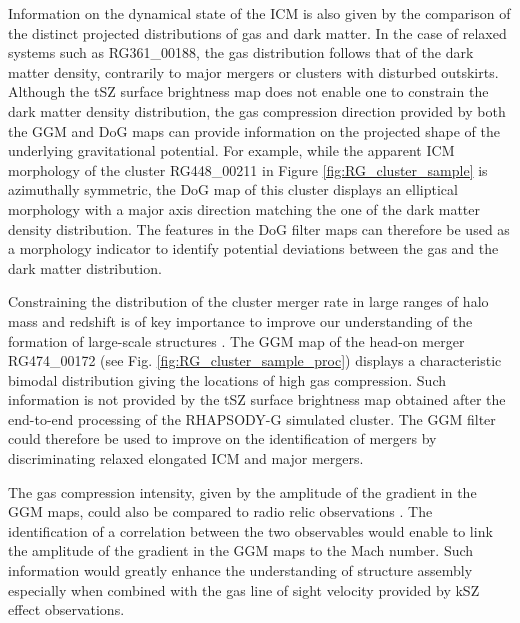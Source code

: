 \documentclass[traditabstract]{aa}
\begin{document}
Information on the dynamical state of the ICM is also given by the comparison of the distinct projected distributions of gas and dark matter. In the case of relaxed systems such as RG361\_00188, the gas distribution follows that of the dark matter density, contrarily to major mergers or clusters with disturbed outskirts. Although the tSZ surface brightness map does not enable one to constrain the dark matter density distribution, the gas compression direction provided by both the GGM and DoG maps can provide information on the projected shape of the underlying gravitational potential. For example, while the apparent ICM morphology of the cluster RG448\_00211 in Figure \ref{fig:RG_cluster_sample} is azimuthally symmetric, the DoG map of this cluster displays an elliptical morphology with a major axis direction matching the one of the dark matter density distribution. The features in the DoG filter maps can therefore be used as a morphology indicator to identify potential deviations between the gas and the dark matter distribution.

Constraining the distribution of the cluster merger rate in large ranges of halo mass and redshift is of key importance to improve our understanding of the formation of large-scale structures \citep[e.g.,][]{Fakhouri2010}. The GGM map of the head-on merger RG474\_00172 (see Fig. \ref{fig:RG_cluster_sample_proc}) displays a characteristic bimodal distribution giving the locations of high gas compression. Such information is not provided by the tSZ surface brightness map obtained after the end-to-end processing of the RHAPSODY-G simulated cluster. The GGM filter could therefore be used to improve on the identification of mergers by discriminating relaxed elongated ICM and major mergers. 

The gas compression intensity, given by the amplitude of the gradient in the GGM maps, could also be compared to radio relic observations \citep[e.g.,][]{vanWeeren2010}. The identification of a correlation between the two observables would enable to link the amplitude of the gradient in the GGM maps to the Mach number. Such information would greatly enhance the understanding of structure assembly especially when combined with the gas line of sight velocity provided by kSZ effect observations.

\end{document}
